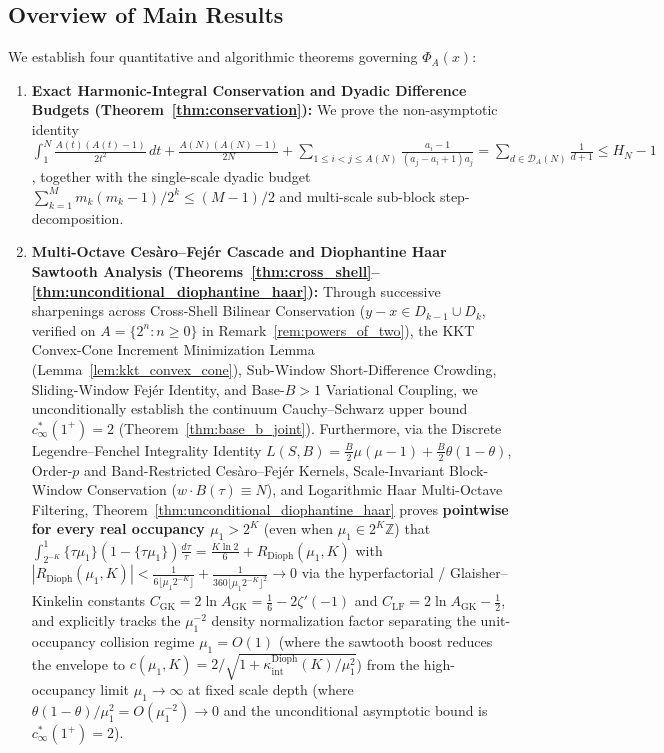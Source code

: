 \documentclass[11pt,reqno]{amsart}
\theoremstyle{definition}
\theoremstyle{remark}
\begin{document}
\subsection*{Overview of Main Results}
We establish four quantitative and algorithmic theorems governing $\Phi_A(x)$:
\begin{enumerate}
  \item \textbf{Exact Harmonic-Integral Conservation and Dyadic Difference Budgets (Theorem~\ref{thm:conservation}):} We prove the non-asymptotic identity $\int_1^N \frac{A(t)(A(t) - 1)}{2 t^2}\,dt + \frac{A(N)(A(N) - 1)}{2 N} + \sum_{1 \le i < j \le A(N)} \frac{a_i - 1}{(a_j - a_i + 1) a_j} = \sum_{d \in \mathcal{D}_A(N)} \frac{1}{d + 1} \le H_N - 1$, together with the single-scale dyadic budget $\sum_{k=1}^M m_k(m_k-1)/2^k \le (M-1)/2$ and multi-scale sub-block step-decomposition.
  \item \textbf{Multi-Octave Ces\`aro--Fej\'er Cascade and Diophantine Haar Sawtooth Analysis (Theorems~\ref{thm:cross_shell}--\ref{thm:unconditional_diophantine_haar}):} Through successive sharpenings across Cross-Shell Bilinear Conservation ($y - x \in D_{k-1} \cup D_k$, verified on $A = \{2^n : n \ge 0\}$ in Remark~\ref{rem:powers_of_two}), the KKT Convex-Cone Increment Minimization Lemma (Lemma~\ref{lem:kkt_convex_cone}), Sub-Window Short-Difference Crowding, Sliding-Window Fej\'er Identity, and Base-$B > 1$ Variational Coupling, we unconditionally establish the continuum Cauchy--Schwarz upper bound $c_\infty^*(1^+) = 2$ (Theorem~\ref{thm:base_b_joint}). Furthermore, via the Discrete Legendre--Fenchel Integrality Identity $L(S, B) = \frac{B}{2}\mu(\mu-1) + \frac{B}{2}\theta(1-\theta)$, Order-$p$ and Band-Restricted Ces\`aro--Fej\'er Kernels, Scale-Invariant Block-Window Conservation ($w \cdot B(\tau) \equiv N$), and Logarithmic Haar Multi-Octave Filtering, Theorem~\ref{thm:unconditional_diophantine_haar} proves \textbf{pointwise for every real occupancy $\mu_1 > 2^K$} (even when $\mu_1 \in 2^K \mathbb{Z}$) that $\int_{2^{-K}}^1 \{\tau \mu_1\}(1 - \{\tau \mu_1\})\frac{d\tau}{\tau} = \frac{K\ln 2}{6} + R_{\mathrm{Dioph}}(\mu_1, K)$ with $|R_{\mathrm{Dioph}}(\mu_1, K)| < \frac{1}{6\lfloor \mu_1 2^{-K}\rfloor} + \frac{1}{360\lfloor \mu_1 2^{-K}\rfloor^2} \to 0$ via the hyperfactorial / Glaisher--Kinkelin constants $C_{\mathrm{GK}} = 2\ln A_{\mathrm{GK}} = \frac{1}{6} - 2\zeta'(-1)$ and $C_{\mathrm{LF}} = 2\ln A_{\mathrm{GK}} - \frac{1}{2}$, and explicitly tracks the $\mu_1^{-2}$ density normalization factor separating the unit-occupancy collision regime $\mu_1 = O(1)$ (where the sawtooth boost reduces the envelope to $c(\mu_1, K) = 2 / \sqrt{1 + \kappa_{\mathrm{int}}^{\mathrm{Dioph}}(K)/\mu_1^2}$) from the high-occupancy limit $\mu_1 \to \infty$ at fixed scale depth (where $\theta(1-\theta)/\mu_1^2 = O(\mu_1^{-2}) \to 0$ and the unconditional asymptotic bound is $c_\infty^*(1^+) = 2$).

\end{enumerate}
\end{document}
